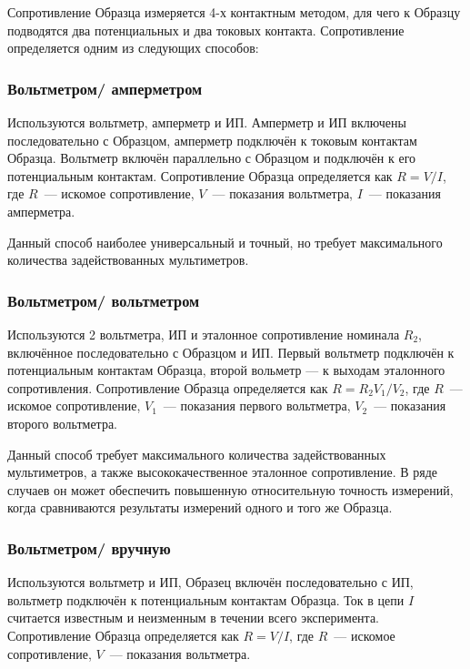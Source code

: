 \label{sec_r_measures}

Сопротивление Образца измеряется 4-х контактным методом, для чего к Образцу подводятся два потенциальных и два токовых контакта. Сопротивление определяется одним из следующих способов:

\subsubsection{Вольтметром/ амперметром}

Используются вольтметр, амперметр и ИП. Амперметр и ИП включены последовательно с Образцом, амперметр подключён к токовым контактам Образца. Вольтметр включён параллельно с Образцом и подключён к его потенциальным контактам. Сопротивление Образца определяется как $R = V/I$, где $R$~--- искомое сопротивление, $V$~--- показания вольтметра, $I$~--- показания амперметра.

Данный способ наиболее универсальный и точный, но требует максимального количества задействованных мультиметров.

\subsubsection{Вольтметром/ вольтметром}

Используются 2 вольтметра, ИП и эталонное сопротивление номинала $R_2$, включённое последовательно с Образцом и ИП. Первый вольтметр подключён  к потенциальным контактам Образца, второй вольметр --- к выходам эталонного сопротивления. Сопротивление Образца определяется как $R = R_2 V_1/V_2$, где $R$~--- искомое сопротивление, $V_1$~--- показания первого вольтметра, $V_2$~--- показания второго вольтметра.

Данный способ требует максимального количества задействованных мультиметров, а также высококачественное эталонное сопротивление. В ряде случаев он может обеспечить повышенную относительную точность измерений, когда сравниваются результаты измерений одного и того же Образца.

\subsubsection{Вольтметром/ вручную}
\label{sec_voltmeter_manually}

Используются вольтметр и ИП, Образец включён последовательно с ИП, вольтметр подключён к потенциальным контактам Образца. Ток в цепи $I$ считается известным  и неизменным в течении всего эксперимента. Сопротивление Образца определяется как $R = V/I$, где $R$~--- искомое сопротивление, $V$~--- показания вольтметра.

